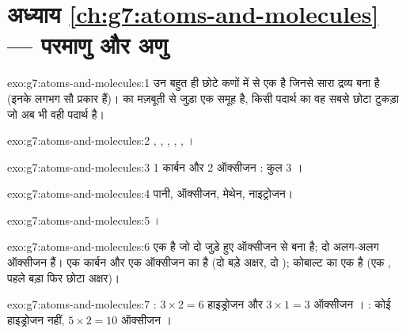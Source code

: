 \section*{अध्याय \ref{ch:g7:atoms-and-molecules} --- परमाणु और अणु}

\begin{solution}{exo:g7:atoms-and-molecules:1}
 उन बहुत ही छोटे कणों में से एक है जिनसे सारा द्रव्य बना है
(इनके लगभग सौ प्रकार हैं)।   का मज़बूती से जुड़ा एक समूह है,
किसी पदार्थ का वह सबसे छोटा टुकड़ा जो अब भी वही
पदार्थ है।
\end{solution}

\begin{solution}{exo:g7:atoms-and-molecules:2}
, , , , , ।
\end{solution}

\begin{solution}{exo:g7:atoms-and-molecules:3}
1 कार्बन  और 2 ऑक्सीजन : कुल 3 ।
\end{solution}

\begin{solution}{exo:g7:atoms-and-molecules:4}
पानी, ऑक्सीजन, मेथेन, नाइट्रोजन।
\end{solution}

\begin{solution}{exo:g7:atoms-and-molecules:5}
।
\end{solution}

\begin{solution}{exo:g7:atoms-and-molecules:6}
 एक  है जो दो जुड़े हुए ऑक्सीजन  से बना है;  दो
अलग-अलग ऑक्सीजन  हैं।  एक कार्बन और एक ऑक्सीजन  का
 है (दो बड़े अक्षर, दो );  कोबाल्ट का एक  है
(एक , पहले बड़ा फिर छोटा अक्षर)।
\end{solution}

\begin{solution}{exo:g7:atoms-and-molecules:7}
: $3\times 2 = 6$ हाइड्रोजन  और $3\times 1 = 3$ ऑक्सीजन
। : कोई हाइड्रोजन नहीं, $5\times 2 = 10$ ऑक्सीजन ।
\end{solution}

